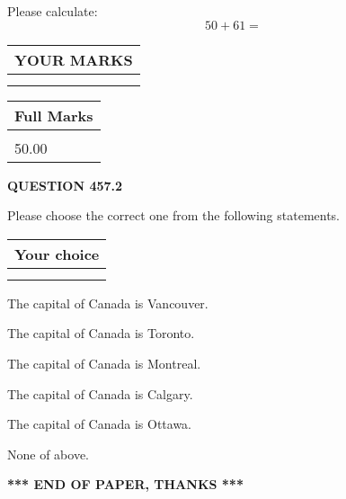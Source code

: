 \documentclass[12pt]{article}
\begin{document}
  
 
Please calculate:
\begin{equation}
50 +  %
61 = \nonumber
\end{equation}
 

 

 
  
\vspace{0.2in}
  
\noindent\begin{tabular}{|l|}
\hline
 YOUR MARKS  \\
\hline
 \\ 
 \\ 
\hline
\end{tabular}
\hspace{0.05in} \begin{tabular}{|l|}
\hline
 Full Marks  \\
\hline
 \\ 
50.00 \\
\hline
\end{tabular}
{\textbf{\Large{QUESTION
457.2 
}}}
  
  
Please choose the correct one from the following statements.
  
  
\noindent\hspace{3.0in} \begin{tabular}{|l|}
\hline
Your choice \\
\hline
 \\ 
 \\ 
\hline
\end{tabular}
  
  
 
 
The capital of Canada is Vancouver.
 
 
The capital of Canada is Toronto.
 
 
The capital of Canada is Montreal.
 
 
The capital of Canada is Calgary.
 
 
The capital of Canada is Ottawa.
 
 
 None of above.
 
 
   
   
 \vspace{0.2in}
 
   
   
   
   
\vspace{1.0in} 
{\textbf{\large{ *** END OF PAPER, THANKS *** }}} 
   
\end{document}
